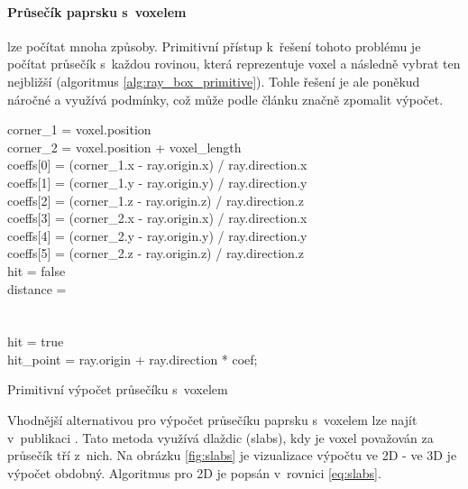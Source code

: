 \paragraph{Průsečík paprsku s~voxelem} lze počítat mnoha způsoby. Primitivní přístup k~řešení tohoto problému je počítat průsečík s~každou rovinou, která reprezentuje voxel a následně vybrat ten nejbližší (algoritmus \ref{alg:ray_box_primitive}). Tohle řešení je ale poněkud náročné a využívá podmínky, což může podle článku \cite{gpu_branch} značně zpomalit výpočet.

\begin{center}
	\begin{czechalgorithm}[H] \label{alg:ray_box_primitive}
		corner_1 = voxel.position\\
		corner_2 = voxel.position + voxel\_length\\
		coeffs[0] = (corner_1.x - ray.origin.x) / ray.direction.x\\
		coeffs[1] = (corner_1.y - ray.origin.y) / ray.direction.y\\
		coeffs[2] = (corner_1.z - ray.origin.z) / ray.direction.z\\
		coeffs[3] = (corner_2.x - ray.origin.x) / ray.direction.x\\
		coeffs[4] = (corner_2.y - ray.origin.y) / ray.direction.y\\
		coeffs[5] = (corner_2.z - ray.origin.z) / ray.direction.z\\
		hit = false\\
		distance = \inf\\
		 {\\
			 {\\
				hit = true\\
				hit\_point = ray.origin + ray.direction * coef;\\
			}
		}
		\caption{Primitivní výpočet průsečíku s~voxelem}
	\end{czechalgorithm}
\end{center}

Vhodnější alternativou pro výpočet průsečíku paprsku s~voxelem lze najít v~publikaci \cite{efficient_box_intersect}. Tato metoda využívá dlaždic (slabs), kdy je voxel považován za průsečík tří z~nich. Na obrázku \ref{fig:slabs} je vizualizace výpočtu ve 2D - ve 3D je výpočet obdobný. Algoritmus pro 2D je popsán v~rovnici \ref{eq:slabs}.


